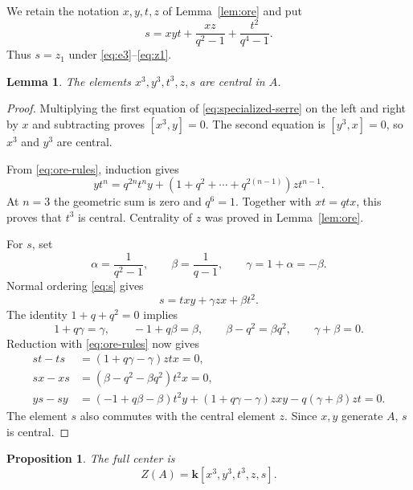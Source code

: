 \documentclass[11pt]{article}
\newtheorem{lemma}[theorem]{Lemma}
\newtheorem{proposition}[theorem]{Proposition}
\newcommand{\kk}{\mathbf{k}}
\begin{document}
We retain the notation $x,y,t,z$ of Lemma~\ref{lem:ore} and put
\begin{equation}
 s=xyt+\frac{xz}{q^2-1}+\frac{t^2}{q^4-1}.
 \label{eq:s}
\end{equation}
Thus $s=z_1$ under \eqref{eq:e3}--\eqref{eq:z1}.

\begin{lemma}\label{lem:central-generators}
The elements $x^3,y^3,t^3,z,s$ are central in $A$.
\end{lemma}

\begin{proof}
Multiplying the first equation of \eqref{eq:specialized-serre} on the left
and right by $x$ and subtracting proves $[x^3,y]=0$.  The second equation is
$[y^3,x]=0$, so $x^3$ and $y^3$ are central.

From \eqref{eq:ore-rules}, induction gives
\[
 yt^n=q^{2n}t^ny+(1+q^2+\cdots+q^{2(n-1)})zt^{n-1}.
\]
At $n=3$ the geometric sum is zero and $q^6=1$.  Together with
$xt=qtx$, this proves that $t^3$ is central.  Centrality of $z$ was proved
in Lemma~\ref{lem:ore}.

For $s$, set
\[
 \alpha=\frac1{q^2-1},\qquad
 \beta=\frac1{q-1},\qquad
 \gamma=1+\alpha=-\beta.
\]
Normal ordering \eqref{eq:s} gives
\[
 s=txy+\gamma zx+\beta t^2.
\]
The identity $1+q+q^2=0$ implies
\[
 1+q\gamma=\gamma,
 \qquad -1+q\beta=\beta,
 \qquad \beta-q^2=\beta q^2,
 \qquad \gamma+\beta=0.
\]
Reduction with \eqref{eq:ore-rules} now gives
\begin{align*}
 st-ts&=(1+q\gamma-\gamma)ztx=0,\\
 sx-xs&=(\beta-q^2-\beta q^2)t^2x=0,\\
 ys-sy&=(-1+q\beta-\beta)t^2y
       +(1+q\gamma-\gamma)zxy-q(\gamma+\beta)zt=0.
\end{align*}
The element $s$ also commutes with the central element $z$.  Since
$x,y$ generate $A$, $s$ is central.
\end{proof}

\begin{proposition}\label{prop:center}
The full center is
\[
 Z(A)=\kk[x^3,y^3,t^3,z,s].
\]
\end{proposition}
\end{document}
